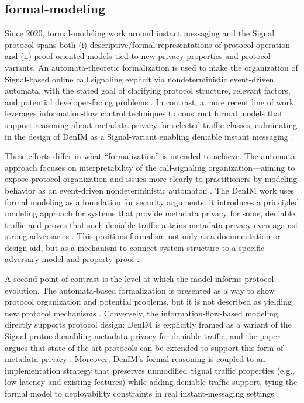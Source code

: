 \subsection{formal-modeling}
Since 2020, formal-modeling work around instant messaging and the Signal protocol spans both (i) descriptive/formal representations of protocol operation and (ii) proof-oriented models tied to new privacy properties and protocol variants. An automata-theoretic formalization is used to make the organization of Signal-based online call signaling explicit via nondeterministic event-driven automata, with the stated goal of clarifying protocol structure, relevant factors, and potential developer-facing problems \cite{vladimirovich2020}. In contrast, a more recent line of work leverages information-flow control techniques to construct formal models that support reasoning about metadata privacy for selected traffic classes, culminating in the design of DenIM as a Signal-variant enabling deniable instant messaging \cite{nelson2024}.

These efforts differ in what “formalization” is intended to achieve. The automata approach focuses on interpretability of the call-signaling organization—aiming to expose protocol organization and issues more clearly to practitioners by modeling behavior as an event-driven nondeterministic automaton \cite{vladimirovich2020}. The DenIM work uses formal modeling as a foundation for security arguments: it introduces a principled modeling approach for systems that provide metadata privacy for some, deniable, traffic and proves that such deniable traffic attains metadata privacy even against strong adversaries \cite{nelson2024}. This positions formalism not only as a documentation or design aid, but as a mechanism to connect system structure to a specific adversary model and property proof \cite{nelson2024}.

A second point of contrast is the level at which the model informs protocol evolution. The automata-based formalization is presented as a way to show protocol organization and potential problems, but it is not described as yielding new protocol mechanisms \cite{vladimirovich2020}. Conversely, the information-flow-based modeling directly supports protocol design: DenIM is explicitly framed as a variant of the Signal protocol enabling metadata privacy for deniable traffic, and the paper argues that state-of-the-art protocols can be extended to support this form of metadata privacy \cite{nelson2024}. Moreover, DenIM’s formal reasoning is coupled to an implementation strategy that preserves unmodified Signal traffic properties (e.g., low latency and existing features) while adding deniable-traffic support, tying the formal model to deployability constraints in real instant-messaging settings \cite{nelson2024}.

